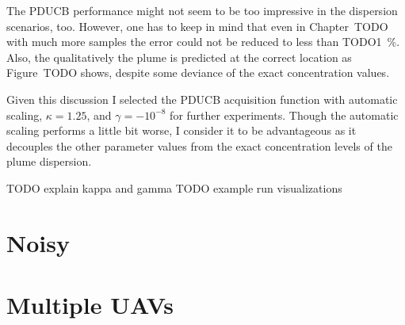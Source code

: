 The PDUCB performance might not seem to be too impressive in the dispersion 
scenarios, too. However, one has to keep in mind that even in Chapter~TODO with 
much more samples the error could not be reduced to less than 
TODO\SI{1}{\percent}.  Also, the qualitatively the plume is predicted at the 
correct location as Figure~TODO shows, despite some deviance of the exact 
concentration values.

Given this discussion I selected the PDUCB acquisition function with automatic 
scaling, $\kappa = 1.25$, and $\gamma = -10^{-8}$ for further experiments.  
Though the automatic scaling performs a little bit worse, I consider it to be 
advantageous as it decouples the other parameter values from the exact 
concentration levels of the plume dispersion.

TODO explain kappa and gamma
TODO example run visualizations

\section{Noisy}

\section{Multiple UAVs}

